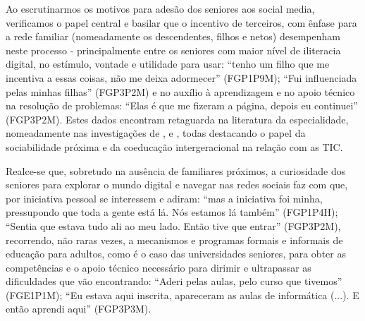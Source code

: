 \documentclass[portuguese]{textolivre}
\begin{document}
Ao escrutinarmos os motivos para adesão dos seniores aos social media, verificamos o papel central e basilar que o incentivo de terceiros, com ênfase para a rede familiar (nomeadamente os descendentes, filhos e netos) desempenham neste processo - principalmente entre os seniores com maior nível de iliteracia digital, no estímulo, vontade e utilidade para usar: “tenho um filho que me incentiva a essas coisas, não me deixa adormecer” (FGP1P9M); “Fui influenciada pelas minhas filhas” (FGP3P2M) e no auxílio à aprendizagem e no apoio técnico na resolução de problemas: “Elas é que me fizeram a página, depois eu continuei” (FGP3P2M). Estes dados encontram retaguarda na literatura da especialidade, nomeadamente nas investigações de \textcite{neves2012}, \textcite{jung2001} e \textcite{coelho2019}, todas destacando o papel da sociabilidade próxima e da coeducação intergeracional na relação com as TIC.

Realce-se que, sobretudo na ausência de familiares próximos, a curiosidade dos seniores para explorar o mundo digital e navegar nas redes sociais faz com que, por iniciativa pessoal se interessem e adiram: “mas a iniciativa foi minha, pressupondo que toda a gente está lá. Nós estamos lá também” (FGP1P4H); “Sentia que estava tudo ali ao meu lado. Então tive que entrar” (FGP3P2M), recorrendo, não raras vezes, a mecanismos e programas formais e informais de educação para adultos, como é o caso das universidades seniores, para obter as competências e o apoio técnico necessário para dirimir e ultrapassar as dificuldades que vão encontrando: “Aderi pelas aulas, pelo curso que tivemos” (FGE1P1M); “Eu estava aqui inscrita, apareceram as aulas de informática (...). E então aprendi aqui” (FGP3P3M).
\end{document}
